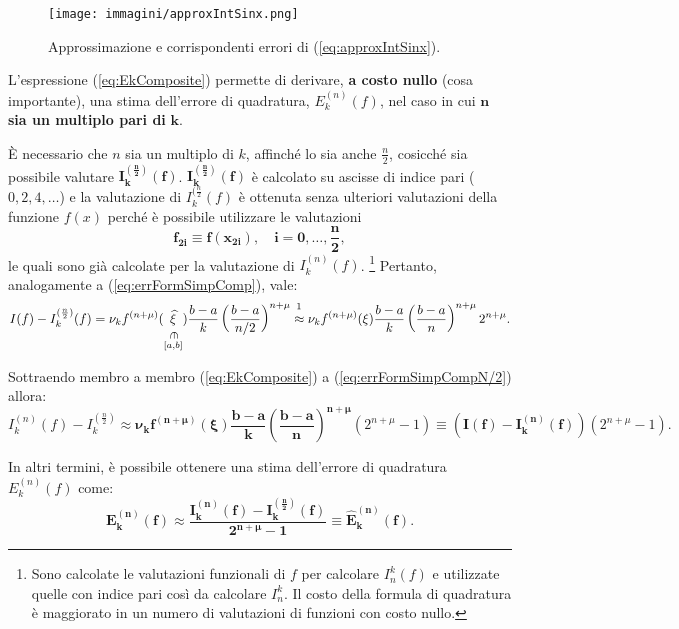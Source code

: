 \begin{figure}
    \centering
    \texttt{[image: immagini/approxIntSinx.png]}
    \caption{Approssimazione e corrispondenti errori di (\ref{eq:approxIntSinx}).}\label{fig:approxIntSinx}
\end{figure}

L'espressione (\ref{eq:EkComposite}) permette di derivare, \textbf{a costo nullo} (cosa importante), una stima dell'errore di quadratura, $E_k^{(n)}(f)$, nel caso in cui $\boldsymbol n$ \textbf{sia un multiplo pari di} $\boldsymbol k$.

È necessario che $n$ sia un multiplo di $k$, affinché lo sia anche $\frac{n}{2}$, cosicché sia possibile valutare $\boldsymbol{I_k^{(\frac{n}{2})}(f)}$. $\boldsymbol{I_k^{(\frac{n}{2})}(f)}$ è calcolato su ascisse di indice pari ($0,2,4,\hdots$) e la valutazione di $I_k^{(\frac{n}{2}}(f)$ è ottenuta senza ulteriori valutazioni della funzione $f(x)$ perché è possibile utilizzare le valutazioni
\begin{equation*}
    \boldsymbol{f_{2i}\equiv f(x_{2i}),\quad i=0,\hdots,\frac{n}{2}},
\end{equation*}
le quali sono già calcolate per la valutazione di $I_k^{(n)}(f)$. \footnote{Sono calcolate le valutazioni funzionali di $f$ per calcolare $I_n^k(f)$ e utilizzate quelle con indice pari così da calcolare $I_n^k$. Il costo della formula di quadratura è maggiorato in un numero di valutazioni di funzioni con costo nullo.} Pertanto, analogamente a (\ref{eq:errFormSimpComp}), vale:
\begin{equation}\label{eq:errFormSimpCompN/2}
    I(f)-I_k^{(\frac{n}{2})}(f)=\nu_k f^{(n+\mu)}(\into{\widehat\xi}{[a,b]})\frac{b-a}{k}\left(\frac{b-a}{n/2}\right)^{n+\mu}\overset{\footnotemark}{\approx}\nu_k f^{(n+\mu)}(\xi)\frac{b-a}{k}\left(\frac{b-a}{n}\right)^{n+\mu}2^{n+\mu}.
\end{equation}

Sottraendo membro a membro (\ref{eq:EkComposite}) a (\ref{eq:errFormSimpCompN/2}) allora:
\begin{equation*}
    I_k^{(n)}(f)-I_k^{(\frac{n}{2})}\approx\boldsymbol{\nu_kf^{(n+\mu)}(\xi)\frac{b-a}{k}\left(\frac{b-a}{n}\right)^{n+\mu}}(2^{n+\mu}-1)\equiv \left(\boldsymbol{I(f)-I_k^{(n)}(f)}\right)(2^{n+\mu}-1).
\end{equation*}

In altri termini, è possibile ottenere una stima dell'errore di quadratura $E_k^{(n)}(f)$ come:
\begin{equation*}
    \boldsymbol{E_k^{(n)}(f)\approx\frac{I_k^{(n)}(f)-I_k^{(\frac{n}{2})}(f)}{2^{n+\mu}-1}\equiv\widehat E_k^{(n)}(f)}.
\end{equation*}

